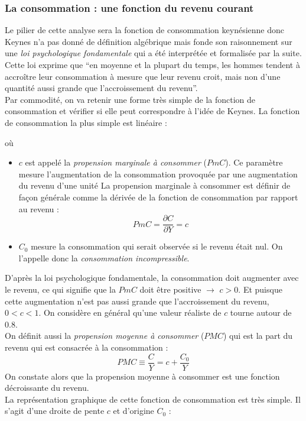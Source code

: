 \documentclass[10pt]{book}
\begin{document}
\subsubsection{La consommation : une fonction du revenu courant}
Le pilier de cette analyse sera la fonction de consommation keynésienne donc Keynes n'a pas donné de définition algébrique mais fonde son raisonnement sur une \textit{loi psychologique fondamentale} qui a été interprétée et formalisée par la suite. Cette loi exprime que ``en moyenne et la plupart du temps, les hommes tendent à accroître leur consommation à mesure que leur revenu croit, mais non d'une quantité aussi grande que l'accroissement du revenu''. \\
Par commodité, on va retenir une forme très simple de la fonction de consommation et vérifier si elle peut correspondre à l'idée de Keynes. La fonction de consommation la plus simple est linéaire : 
\begin{center}
\end{center}
où 
\begin{itemize}
  \item $c$ est appelé la \textit{propension marginale à consommer} ($PmC$). Ce paramètre mesure l'augmentation de la consommation provoquée par une augmentation du revenu d'une unité La propension marginale à consommer est définir de façon générale comme la dérivée de la fonction de consommation par rapport au revenu :
$$ PmC = \frac{\partial C}{\partial Y} = c $$
    \item $C_0$ mesure la consommation qui serait observée si le revenu était nul. On l'appelle donc la \textit{consommation incompressible}. 
\end{itemize}
D'après la loi psychologique fondamentale, la consommation doit augmenter avec le revenu, ce qui signifie que la $PmC$ doit être positive $\rightarrow$ $c>0$. Et puisque cette augmentation n'est pas aussi grande que l'accroissement du revenu, $0 < c < 1$. On considère en général qu'une valeur réaliste de $c$ tourne autour de $0.8$. \\
On définit aussi la \textit{propension moyenne à consommer} ($PMC$) qui est la part du revenu qui est consacrée à la consommation :
$$ PMC \equiv \frac{C}{Y} = c + \frac{C_0}{Y} $$
On constate alors que la propension moyenne à consommer est une fonction décroissante du revenu. \\
La représentation graphique de cette fonction de consommation est très simple. Il s'agit d'une droite de pente $c$ et d'origine $C_0$ :
\end{document}
